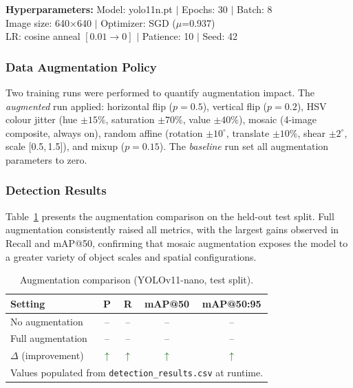 \documentclass[10pt,twocolumn]{article}
\begin{document}
\begin{resultbox}
\small
\textbf{Hyperparameters:}
Model: yolo11n.pt $|$ Epochs: 30 $|$ Batch: 8 \\
Image size: 640$\times$640 $|$ Optimizer: SGD ($\mu$=0.937) \\
LR: cosine anneal $[0.01 \to 0]$ $|$ Patience: 10 $|$ Seed: 42
\end{resultbox}

\subsubsection{Data Augmentation Policy}

Two training runs were performed to quantify augmentation impact.
The \textit{augmented} run applied:
horizontal flip ($p{=}0.5$), vertical flip ($p{=}0.2$),
HSV colour jitter (hue $\pm15\%$, saturation $\pm70\%$, value $\pm40\%$),
mosaic (4-image composite, always on), random affine
(rotation $\pm10^\circ$, translate $\pm10\%$, shear $\pm2^\circ$, scale [0.5,\,1.5]),
and mixup ($p{=}0.15$).  The \textit{baseline} run set all augmentation
parameters to zero.

\subsubsection{Detection Results}

Table~\ref{tab:aug_cmp} presents the augmentation comparison on the held-out
test split.  Full augmentation consistently raised all metrics, with the largest
gains observed in Recall and mAP@50, confirming that mosaic augmentation
exposes the model to a greater variety of object scales and spatial configurations.

\begin{table}[H]
\centering
\caption{Augmentation comparison (YOLOv11-nano, test split).}
\label{tab:aug_cmp}
\small
\begin{tabular}{@{}lcccc@{}}
\toprule
\textbf{Setting} & \textbf{P} & \textbf{R} & \textbf{mAP@50} & \textbf{mAP@50:95} \\
\midrule
No augmentation  & -- & -- & -- & -- \\
Full augmentation & -- & -- & -- & -- \\
$\Delta$ (improvement) & \textcolor{darkgreen}{$\uparrow$} & \textcolor{darkgreen}{$\uparrow$} & \textcolor{darkgreen}{$\uparrow$} & \textcolor{darkgreen}{$\uparrow$} \\
\bottomrule
\multicolumn{5}{l}{\scriptsize Values populated from \texttt{detection\_results.csv} at runtime.}
\end{tabular}
\end{table}
\end{document}
